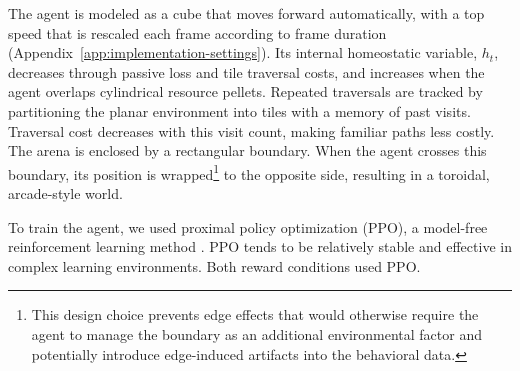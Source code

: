 \documentclass[12pt,fleqn]{article}
\begin{document}
The agent is modeled as a cube that moves forward automatically, with a top speed that is rescaled each frame according to frame duration (Appendix~\ref{app:implementation-settings}). Its internal homeostatic variable, $h_t$, decreases through passive loss and tile traversal costs, and increases when the agent overlaps cylindrical resource pellets. Repeated traversals are tracked by partitioning the planar environment into tiles with a memory of past visits. Traversal cost decreases with this visit count, making familiar paths less costly. The arena is enclosed by a rectangular boundary. When the agent crosses this boundary, its position is wrapped\footnote{This design choice prevents edge effects that would otherwise require the agent to manage the boundary as an additional environmental factor and potentially introduce edge-induced artifacts into the behavioral data.} to the opposite side, resulting in a toroidal, arcade-style world.

To train the agent, we used proximal policy optimization (PPO), a model-free reinforcement learning method \cite{schulman_proximal_2017}. PPO tends to be relatively stable and effective in complex learning environments. Both reward conditions used PPO.

\end{document}
